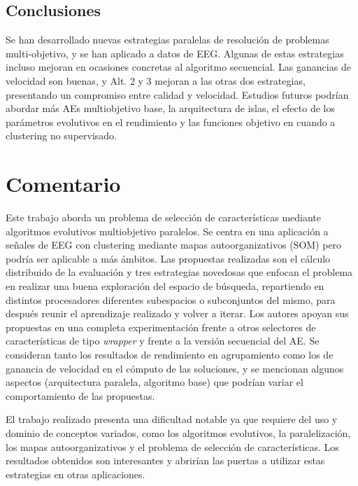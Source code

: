 \documentclass{article}
\begin{document}
\subsection{Conclusiones}
\label{sec-1-6}

Se han desarrollado nuevas estrategias paralelas de resolución de problemas multi-objetivo, y se han aplicado a datos de EEG. Algunas de estas estrategias incluso mejoran en ocasiones concretas al algoritmo secuencial. Las ganancias de velocidad son buenas, y Alt. 2 y 3 mejoran a las otras dos estrategias, presentando un compromiso entre calidad y velocidad. Estudios futuros podrían abordar más AEs multiobjetivo base, la arquitectura de islas, el efecto de los parámetros evolutivos en el rendimiento y las funciones objetivo en cuando a clustering no supervisado.

\section{Comentario}
\label{sec-2}

Este trabajo aborda un problema de selección de características mediante algoritmos evolutivos multiobjetivo paralelos. Se centra en una aplicación a señales de EEG con clustering mediante mapas autoorganizativos (SOM) pero podría ser aplicable a más ámbitos. Las propuestas realizadas son el cálculo distribuido de la evaluación y tres estrategias novedosas que enfocan el problema en realizar una buena exploración del espacio de búsqueda, repartiendo en distintos procesadores diferentes subespacios o subconjuntos del mismo, para después reunir el aprendizaje realizado y volver a iterar. Los autores apoyan sus propuestas en una completa experimentación frente a otros selectores de características de tipo \emph{wrapper} y frente a la versión secuencial del AE. Se consideran tanto los resultados de rendimiento en agrupamiento como los de ganancia de velocidad en el cómputo de las soluciones, y se mencionan algunos aspectos (arquitectura paralela, algoritmo base) que podrían variar el comportamiento de las propuestas.

El trabajo realizado presenta una dificultad notable ya que requiere del uso y dominio de conceptos variados, como los algoritmos evolutivos, la paralelización, los mapas autoorganizativos y el problema de selección de características. Los resultados obtenidos son interesantes y abrirían las puertas a utilizar estas estrategias en otras aplicaciones.
\end{document}
